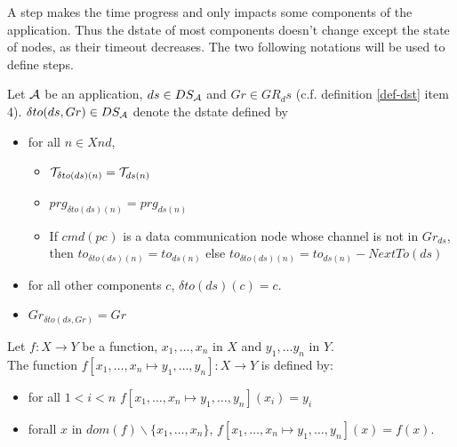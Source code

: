 \documentclass{article}
\begin{document}
A step makes the time progress and only impacts some components of the application. Thus the dstate of most components doesn't change except the state of nodes, as their timeout decreases. The two following notations will be used to define steps.
\begin{definition}\label{def-to}$~$\\
Let ${\cal A}$ be an application, $ds\in DS_{\cal A}$ and $Gr\in GR_ds$ (c.f. definition \ref{def-dst} item 4).
$\delta to(ds,Gr)\in DS_{\cal A}$ denote the dstate defined by
\begin{itemize}
\item for all $n\in X\!nd$,
    \begin{itemize}
		\item ${\cal T}_{\delta to(ds)(n)}={\cal T}_{ds(n)}$
		\item $prg_{\delta to(ds)(n)}=prg_{ds(n)}$
		\item If $cmd(pc_{})$ is a data communication node whose channel is not in $Gr_{ds}$, then $to_{\delta to(ds)(n)}=to_{ds(n)}$ else $to_{\delta to(ds)(n)}=to_{ds(n)}- NextT\!o(ds)$
		\end{itemize}
\item for all other components $c$, $\delta to(ds)(c)=c$.
\item $Gr_{\delta to(ds,Gr)}=Gr$
\end{itemize} 
\vspace{1mm}
Let $f:X\rightarrow Y$ be a function,
$x_1,\ldots,x_n$ in $X$ and $y_1,\ldots y_n$ in $Y$.\\
The function $f[x_1,\ldots,x_n\mapsto y_1,\ldots,y_n]:X\rightarrow Y$ is defined by: 
\begin{itemize}
\item for all $1<i<n$ $f[x_1,\ldots,x_n\mapsto y_1,\ldots,y_n](x_i)=y_i$
\item forall $x$ in $dom(f)\backslash\{x_1,\ldots,x_n\}$, $f[x_1,\ldots,x_n\mapsto y_1,\ldots,y_n](x)=f(x)$.
\end{itemize}
\end{definition}
\end{document}
